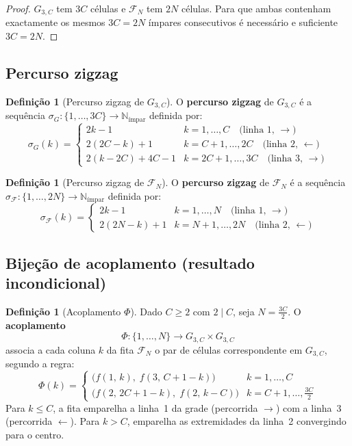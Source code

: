 \documentclass[12pt, a4paper]{article}
\theoremstyle{plain}
\theoremstyle{definition}
\newtheorem{definition}[theorem]{Definição}
\theoremstyle{remark}
\begin{document}
	\begin{proof}
		$G_{3,C}$ tem $3C$ células e $\mathcal{F}_N$ tem $2N$ células.
		Para que ambas contenham exactamente os mesmos $3C=2N$ ímpares
		consecutivos é necessário e suficiente $3C=2N$.
	\end{proof}
	
	\subsection{Percurso zigzag}
	
	\begin{definition}[Percurso zigzag de $G_{3,C}$]
		\label{def:zigzag-grade}
		O \textbf{percurso zigzag} de $G_{3,C}$ é a sequência
		$\sigma_G:\{1,\ldots,3C\}\to\mathbb{N}_{\text{ímpar}}$ definida
		por:
		\[
		\sigma_G(k) = \begin{cases}
			2k-1
			& k=1,\ldots,C
			\quad\text{(linha~1, }\rightarrow\text{)}\\[4pt]
			2(2C-k)+1
			& k=C+1,\ldots,2C
			\quad\text{(linha~2, }\leftarrow\text{)}\\[4pt]
			2(k-2C)+4C-1
			& k=2C+1,\ldots,3C
			\quad\text{(linha~3, }\rightarrow\text{)}
		\end{cases}
		\]
	\end{definition}
	
	\begin{definition}[Percurso zigzag de $\mathcal{F}_N$]
		\label{def:zigzag-fita}
		O \textbf{percurso zigzag} de $\mathcal{F}_N$ é a sequência
		$\sigma_{\mathcal{F}}:\{1,\ldots,2N\}\to\mathbb{N}_{\text{ímpar}}$
		definida por:
		\[
		\sigma_{\mathcal{F}}(k) = \begin{cases}
			2k-1
			& k=1,\ldots,N
			\quad\text{(linha~1, }\rightarrow\text{)}\\[4pt]
			2(2N-k)+1
			& k=N+1,\ldots,2N
			\quad\text{(linha~2, }\leftarrow\text{)}
		\end{cases}
		\]
	\end{definition}
	
	\subsection{Bijeção de acoplamento (resultado incondicional)}
	
	\begin{definition}[Acoplamento $\Phi$]
		\label{def:phi}
		Dado $C\geq2$ com $2\mid C$, seja $N=\frac{3C}{2}$.
		O \textbf{acoplamento}
		\[
		\Phi: \{1,\ldots,N\} \longrightarrow G_{3,C}\times G_{3,C}
		\]
		associa a cada coluna $k$ da fita $\mathcal{F}_N$ o par de células
		correspondente em $G_{3,C}$, segundo a regra:
		\[
		\Phi(k) = \begin{cases}
			\bigl(f(1,\,k),\; f(3,\,C+1-k)\bigr)
			& k = 1,\ldots,C\\[6pt]
			\bigl(f(2,\,2C+1-k),\; f(2,\,k-C)\bigr)
			& k = C+1,\ldots,\tfrac{3C}{2}
		\end{cases}
		\]
		Para $k\leq C$, a fita emparelha a linha~1 da grade
		(percorrida $\rightarrow$) com a linha~3 (percorrida
		$\leftarrow$).  Para $k>C$, emparelha as extremidades da linha~2
		convergindo para o centro.
	\end{definition}
	
\end{document}

